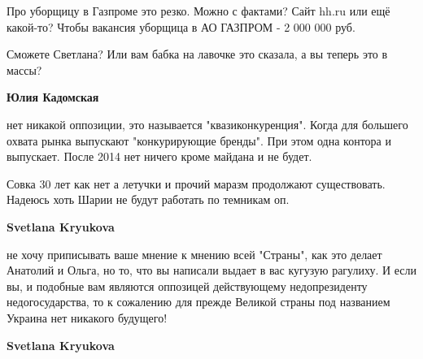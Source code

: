 \begin{itemize}
\begin{itemize}
 

Про уборщицу в Газпроме это резко. Можно с фактами? Сайт hh.ru или ещё
какой-то? Чтобы вакансия уборщица в АО ГАЗПРОМ - 2 000 000 руб. 

Сможете Светлана? Или вам бабка на лавочке это сказала, а вы теперь это в
массы?


 
\textbf{Юлия Кадомская} 

нет никакой оппозиции, это называется "квазиконкуренция". Когда для большего
охвата рынка выпускают "конкурирующие бренды". При этом одна контора и
выпускает. После 2014 нет ничего кроме майдана и не будет.


 

Совка 30 лет как нет а летучки и прочий маразм продолжают существовать. Надеюсь
хоть Шарии не будут работать по темникам оп.

 
\textbf{Svetlana Kryukova} 

не хочу приписывать ваше мнение к мнению всей "Страны", как это делает Анатолий
и Ольга, но то, что вы написали выдает в вас кугузую рагулиху. И если вы, и
подобные вам являются оппозицей действующему недопрезиденту недогосударства, то
к сожалению для прежде Великой страны под названием Украина нет никакого
будущего!

 
\textbf{Svetlana Kryukova} 


\end{itemize}
\end{itemize}
